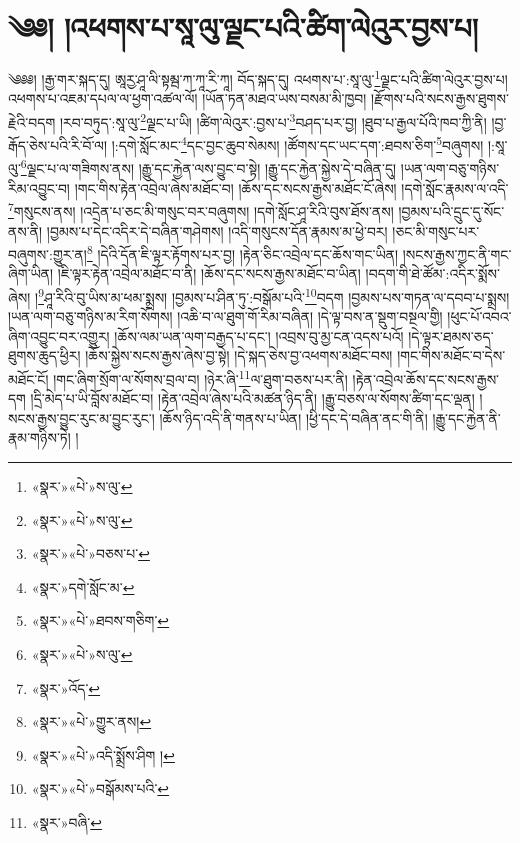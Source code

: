 \chapter{༄༅། །འཕགས་པ་སཱ་ལུ་ལྗང་པའི་ཚིག་ལེའུར་བྱས་པ།}༄༅༅། །རྒྱ་གར་སྐད་དུ། ཨཱརྱ་ཤཱ་ལི་སྟམྦ་ཀ་ཀཱ་རི་ཀཱ། བོད་སྐད་དུ། འཕགས་པ་:སཱ་ལུ་\footnote{«སྣར་»«པེ་»ས་ལུ་}ལྗང་པའི་ཚིག་ལེའུར་བྱས་པ། འཕགས་པ་འཇམ་དཔལ་ལ་ཕྱག་འཚལ་ལོ། །ཡོན་ཏན་མཐའ་ཡས་བསམ་མི་ཁྱབ། །རྫོགས་པའི་སངས་རྒྱས་ཐུགས་རྗེའི་བདག །རབ་བཏུད་:སཱ་ལུ་\footnote{«སྣར་»«པེ་»ས་ལུ་}ལྗང་པ་ཡི། །ཚིག་ལེའུར་:བྱས་པ་\footnote{«སྣར་»«པེ་»བཅས་པ་}བཤད་པར་བྱ། །ཐུབ་པ་རྒྱལ་པོའི་ཁབ་ཀྱི་ནི། །བྱ་རྒོད་ཅེས་པའི་རི་བོ་ལ། །:དགེ་སློང་མང་\footnote{«སྣར་»དགེ་སློང་མ་}དང་བྱང་ཆུབ་སེམས། །ཚོགས་དང་ཡང་དག་:ཐབས་ཅིག་\footnote{«སྣར་»«པེ་»ཐབས་གཅིག་}བཞུགས། །:སཱ་ལུ་\footnote{«སྣར་»«པེ་»ས་ལུ་}ལྗང་པ་ལ་གཟིགས་ནས། །རྒྱུ་དང་རྐྱེན་ལས་བྱུང་བ་སྟེ། །རྒྱུ་དང་རྐྱེན་སྐྱེས་དེ་བཞིན་དུ། །ཡན་ལག་བཅུ་གཉིས་རིམ་འབྱུང་བ། །གང་གིས་རྟེན་འབྲེལ་ཞེས་མཐོང་བ། །ཆོས་དང་སངས་རྒྱས་མཐོང་ངོ་ཞེས། །དགེ་སློང་རྣམས་ལ་འདི་\footnote{«སྣར་»འོད་}གསུངས་ནས། །འདྲེན་པ་ཅང་མི་གསུང་བར་བཞུགས། །དགེ་སློང་ཤཱ་རིའི་བུས་ཐོས་ནས། །བྱམས་པའི་དྲུང་དུ་སོང་ནས་ནི། །བྱམས་པ་དེང་འདིར་དེ་བཞིན་གཤེགས། །འདི་གསུངས་དོན་རྣམས་མ་ཕྱེ་བར། །ཅང་མི་གསུང་པར་བཞུགས་:གྱུར་ན།\footnote{«སྣར་»«པེ་»གྱུར་ནས།} །དེའི་དོན་ཇི་ལྟར་རྟོགས་པར་བྱ། །རྟེན་ཅིང་འབྲེལ་དང་ཆོས་གང་ཡིན། །སངས་རྒྱས་ཀྱང་ནི་གང་ཞིག་ཡིན། །ཇི་ལྟར་རྟེན་འབྲེལ་མཐོང་བ་ནི། །ཆོས་དང་སངས་རྒྱས་མཐོང་བ་ཡིན། །བདག་གི་ཐེ་ཚོམ་:འདིར་སྨོས་ཞེས། །\footnote{«སྣར་»«པེ་»འདི་སྨྲོས་ཤིག །}ཤཱ་རིའི་བུ་ཡིས་མ་ཕམ་སྨྲས། །བྱམས་པ་ཤིན་ཏུ་:བསྒོམ་པའི་\footnote{«སྣར་»«པེ་»བསྒོམས་པའི་}བདག །བྱམས་པས་གཏན་ལ་དབབ་པ་སྨྲས། །ཡན་ལག་བཅུ་གཉིས་མ་རིག་སོགས། །འཆི་བ་ལ་ཐུག་གོ་རིམ་བཞིན། །དེ་ལྟ་བས་ན་སྡུག་བསྔལ་གྱི། །ཕུང་པོ་འབའ་ཞིག་འབྱུང་བར་འགྱུར། །ཆོས་ལམ་ཡན་ལག་བརྒྱད་པ་དང་། །འབྲས་བུ་མྱ་ངན་འདས་པའོ། །དེ་ལྟར་ཐམས་ཅད་ཐུགས་ཆུད་ཕྱིར། །ཆོས་སྐྱེས་སངས་རྒྱས་ཞེས་བྱ་སྟེ། །དེ་སྐད་ཅེས་བྱ་འཕགས་མཐོང་བས། །གང་གིས་མཐོང་བ་དེས་མཐོང་ངོ། །གང་ཞིག་སྲོག་ལ་སོགས་བྲལ་བ། །ཉེར་ཞི་\footnote{«སྣར་»བཞི་}ལ་ཐུག་བཅས་པར་ནི། །རྟེན་འབྲེལ་ཆོས་དང་སངས་རྒྱས་དག །དྲི་མེད་པ་ཡི་བློས་མཐོང་བ། །རྟེན་འབྲེལ་ཞེས་པའི་མཚན་ཉིད་ནི། །རྒྱུ་བཅས་ལ་སོགས་ཚིག་དང་ལྡན། །སངས་རྒྱས་བྱུང་རུང་མ་བྱུང་རུང་། །ཆོས་ཉིད་འདི་ནི་གནས་པ་ཡིན། །ཕྱི་དང་དེ་བཞིན་ནང་གི་ནི། །རྒྱུ་དང་རྐྱེན་ནི་རྣམ་གཉིས་ཏེ། །
